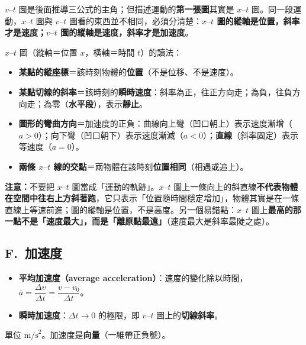 \documentclass[11pt]{article}
\begin{document}
$v\text{–}t$ 圖是後面推導三公式的主角；但描述運動的\textbf{第一張圖}其實是 $x\text{–}t$ 圖。同一段運動，$x\text{–}t$ 圖與 $v\text{–}t$ 圖看的東西並不相同，必須分清楚：\textbf{$x\text{–}t$ 圖的縱軸是位置，斜率才是速度；$v\text{–}t$ 圖的縱軸是速度，斜率才是加速度}。

$x\text{–}t$ 圖（縱軸＝位置 $x$，橫軸＝時間 $t$）的讀法：
\begin{itemize}\setlength{\itemsep}{2pt}
\item \textbf{某點的縱座標}＝該時刻物體的\textbf{位置}（不是位移、不是速度）。
\item \textbf{某點切線的斜率}＝該時刻的\textbf{瞬時速度}：斜率為正，往正方向走；為負，往負方向走；為零（\textbf{水平段}），表示\textbf{靜止}。
\item \textbf{圖形的彎曲方向}＝加速度的正負：曲線向上彎（凹口朝上）表示速度漸增（$a>0$）；向下彎（凹口朝下）表示速度漸減（$a<0$）；\textbf{直線}（斜率固定）表示等速度（$a=0$）。
\item \textbf{兩條 $x\text{–}t$ 線的交點}＝兩物體在該時刻\textbf{位置相同}（相遇或追上）。
\end{itemize}

\textbf{注意：}不要把 $x\text{–}t$ 圖當成「運動的軌跡」。$x\text{–}t$ 圖上一條向上的斜直線\textbf{不代表物體在空間中往右上方斜著跑}，它只表示「位置隨時間穩定增加」，物體其實是在一條直線上等速前進；圖的縱軸是位置，不是高度。另一個易錯點：$x\text{–}t$ 圖上\textbf{最高的那一點不是「速度最大」，而是「離原點最遠」}（速度最大是斜率最陡之處）。


\subsection*{\sffamily F.\ 加速度}

\begin{itemize}\setlength{\itemsep}{2pt}
\item \textbf{平均加速度（average acceleration）}：速度的變化除以時間，$\bar a = \dfrac{\Delta v}{\Delta t} = \dfrac{v - v_0}{\Delta t}$。
\item \textbf{瞬時加速度}：$\Delta t \to 0$ 的極限，即 $v\text{–}t$ 圖上的\textbf{切線斜率}。
\end{itemize}
單位 $\text{m/s}^2$。加速度是\textbf{向量}（一維帶正負號）。
\end{document}
